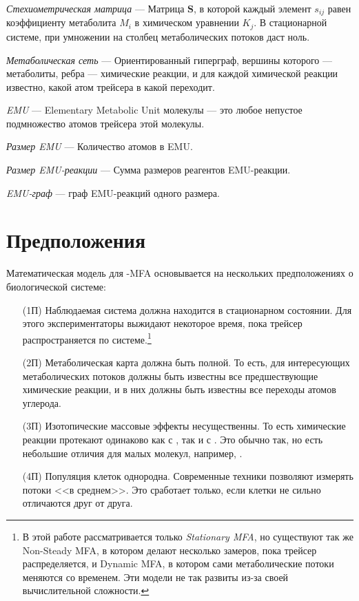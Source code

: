 \documentclass[14pt, a4paper]{extreport}
\begin{document}
\hangindent=1cm \noindent
\emph{Стехиометрическая матрица} --- Матрица $\mathbf{S}$, в которой каждый элемент $s_{ij}$ равен коэффициенту метаболита $M_i$ в химическом уравнении $K_j$. В стационарной системе, при умножении на столбец метаболических потоков даст ноль.

\hangindent=1cm \noindent
\emph{Метаболическая сеть} --- Ориентированный гиперграф, вершины которого --- метаболиты, ребра --- химические реакции, и для каждой химической реакции известно, какой атом трейсера в какой переходит.

\hangindent=1cm \noindent
\emph{EMU} --- Elementary Metabolic Unit молекулы --- это любое непустое подмножество атомов трейсера этой молекулы.

\hangindent=1cm \noindent
\emph{Размер EMU} --- Количество атомов в EMU.

\hangindent=1cm \noindent
\emph{Размер EMU-реакции} --- Сумма размеров реагентов EMU-реакции.

\hangindent=1cm \noindent
\emph{EMU-граф} --- граф EMU-реакций одного размера.



\clearpage

\section{Предположения}
Математическая модель для -MFA основывается на нескольких предположениях о биологической системе\cite{Wiechert_1997_1}:
\begin{enumerate}
	\item[(1П)] Наблюдаемая система должна находится в стационарном состоянии. Для этого экспериментаторы выжидают некоторое время, пока трейсер распространяется по системе.\footnote{В этой работе рассматривается только \emph{Stationary MFA}, но существуют так же Non-Steady MFA\cite{NMFA}, в котором делают несколько замеров, пока трейсер распределяется, и Dynamic MFA\cite{DMFA}, в котором сами метаболические потоки меняются со временем. Эти модели не так развиты из-за своей вычислительной сложности.}
	
	\item[(2П)] Метаболическая карта должна быть полной. То есть, для интересующих метаболических потоков должны быть известны все предшествующие химические реакции, и в них должны быть известны все переходы атомов углерода.
	
	\item[(3П)] Изотопические массовые эффекты несущественны. То есть химические реакции протекают одинаково как с , так и с . Это обычно так, но есть небольшие отличия для малых молекул, например, .
	
	\item[(4П)] Популяция клеток однородна. Современные техники позволяют измерять потоки <<в среднем>>. Это сработает только, если клетки не сильно отличаются друг от друга.
\end{enumerate}
\end{document}
